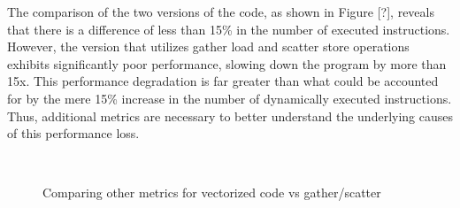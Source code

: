 \documentclass[\main/thesis.tex]{subfiles}
\begin{document}
The comparison of the two versions of the code, as shown in Figure [?], reveals that there is a difference of less than 15\% in the number of executed instructions. However, the version that utilizes gather load and scatter store operations exhibits significantly poor performance, slowing down the program by more than 15x. This performance degradation is far greater than what could be accounted for by the mere 15\% increase in the number of dynamically executed instructions. Thus, additional metrics are necessary to better understand the underlying causes of this performance loss.

\begin{figure}[h]
    \centering
    \hfill
    \\
    \hfill
    \caption{Comparing other metrics for vectorized code vs gather/scatter}
    \label{fig:four-images}
\end{figure}
\end{document}
